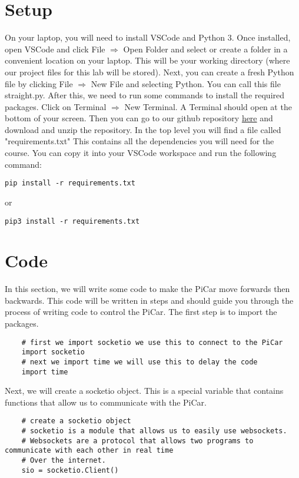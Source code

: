 \documentclass[11pt]{report}
\begin{document}
\section{Setup}
On your laptop, you will need to install VSCode and Python 3. Once installed, open VSCode and click File $\Rightarrow$ Open Folder and select or create a folder in a convenient location on your laptop. This will be your working directory (where our project files for this lab will be stored). Next, you can create a fresh Python file by clicking File $\Rightarrow$ New File and selecting Python. You can call this file straight.py. After this, we need to run some commands to install the required packages. Click on Terminal $\Rightarrow$ New Terminal. A Terminal should open at the bottom of your screen. Then you can go to our github repository \href{https://github.com/PiCarV/Demos}{here} and download and unzip the repository. In the top level you will find a file called "requirements.txt" This contains all the dependencies you will need for the course. You can copy it into your VSCode workspace and run the following command:
\begin{verbatim}
pip install -r requirements.txt
\end{verbatim}
or 
\begin{verbatim}
pip3 install -r requirements.txt
\end{verbatim}
\section{Code}
In this section, we will write some code to make the PiCar move forwards then backwards. This code will be written in steps and should guide you through the process of writing code to control the PiCar. The first step is to import the packages.
\begin{verbatim}
    # first we import socketio we use this to connect to the PiCar
    import socketio 
    # next we import time we will use this to delay the code
    import time
\end{verbatim}

Next, we will create a socketio object. This is a special variable that contains functions that allow us to communicate with the PiCar.

\begin{verbatim}
    # create a socketio object
    # socketio is a module that allows us to easily use websockets.
    # Websockets are a protocol that allows two programs to communicate with each other in real time
    # Over the internet. 
    sio = socketio.Client()
    \end{verbatim}
\end{document}
